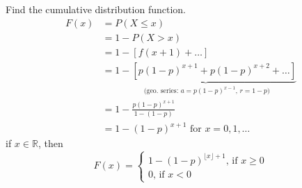 Find the cumulative distribution function.
\begin{align*}
    F(x)&=P(X\le x)\\
    &=1-P(X>x)\\
    &=1-[f(x+1)+\dots]\\
    &=\underbrace{1-[p(1-p)^{x+1}+p(1-p)^{x+2}+\dots]}_
    \text{ (geo. series: $a=p(1-p)^{x-1}$, $r=1-p$)}\\
    &=1-\frac{p(1-p)^{x+1}}{1-(1-p)}\\
    &=1-(1-p)^{x+1} \text{ for } x=0,1,\ldots
\end{align*}
if $ x\in\mathbb{R} $, then
\[ F(x)=
\begin{cases}
    1-(1-p)^{\lfloor x \rfloor +1} \text{, if } x\ge 0\\
    0 \text{, if } x < 0
\end{cases} \]


